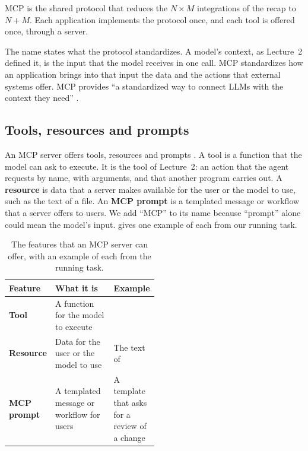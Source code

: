 MCP is the shared protocol that reduces the $N \times M$ integrations of the recap to $N + M$. Each
application implements the protocol once, and each tool is offered once, through a server.

The name states what the protocol standardizes. A model's context, as Lecture~2 defined it, is the
input that the model receives in one call. MCP standardizes how an application brings into that
input the data and the actions that external systems offer. MCP provides ``a standardized way to
connect LLMs with the context they need'' \citep{mcp-spec-2026}.

\subsection{Tools, resources and prompts}
\label{sec:mcp-features}

An MCP server offers tools, resources and prompts \citep{mcp-spec-2026}. A tool is a function that
the model can ask to execute. It is the tool of Lecture~2: an action that the agent requests by
name, with arguments, and that another program carries out. A \textbf{resource} is data that a server makes
available for the user or the model to use, such as the text of a file. An \textbf{MCP prompt} is a
templated message or workflow that a server offers to users. We add ``MCP'' to its name because
``prompt'' alone could mean the model's input.  gives one example of each
from our running task.

\begin{table}[htbp]
  \caption{The features that an MCP server can offer, with an example of each from the running
  task.}
  \label{tab:mcp-features}
  \begin{adjustbox}{width=\linewidth}\begin{tabularx}{\linewidth}{L{0.2\linewidth}XL{0.3\linewidth}}
    \toprule
    \textbf{Feature} & \textbf{What it is} & \textbf{Example} \\
    \midrule
    \textbf{Tool} & A function for the model to execute &  \\
    \textbf{Resource} & Data for the user or the model to use & The text of  \\
    \textbf{MCP prompt} & A templated message or workflow for users & A template that asks for a review of a change \\
    \bottomrule
  \end{tabularx}\end{adjustbox}
\end{table}

